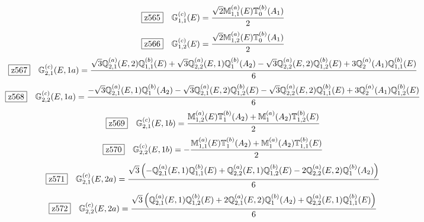 \documentclass[fleqn,10pt,landscape]{jsarticle}
\begin{document}
\begin{dmath*}
\hspace*{3mm}\fbox{z565}\quad \mathbb{G}_{1,1}^{(c)}(E)=\frac{\sqrt{2} \mathbb{M}_{1,1}^{(a)}(E) \mathbb{T}_{0}^{(b)}(A_{1})}{2}
\end{dmath*}
\begin{dmath*}
\hspace*{3mm}\fbox{z566}\quad \mathbb{G}_{1,2}^{(c)}(E)=\frac{\sqrt{2} \mathbb{M}_{1,2}^{(a)}(E) \mathbb{T}_{0}^{(b)}(A_{1})}{2}
\end{dmath*}
\begin{dmath*}
\hspace*{3mm}\fbox{z567}\quad \mathbb{G}_{2,1}^{(c)}(E,1a)=\frac{\sqrt{3} \mathbb{Q}_{2,1}^{(a)}(E,2) \mathbb{Q}_{1,1}^{(b)}(E) + \sqrt{3} \mathbb{Q}_{2,2}^{(a)}(E,1) \mathbb{Q}_{1}^{(b)}(A_{2}) - \sqrt{3} \mathbb{Q}_{2,2}^{(a)}(E,2) \mathbb{Q}_{1,2}^{(b)}(E) + 3 \mathbb{Q}_{2}^{(a)}(A_{1}) \mathbb{Q}_{1,1}^{(b)}(E)}{6}
\end{dmath*}
\begin{dmath*}
\hspace*{3mm}\fbox{z568}\quad \mathbb{G}_{2,2}^{(c)}(E,1a)=\frac{- \sqrt{3} \mathbb{Q}_{2,1}^{(a)}(E,1) \mathbb{Q}_{1}^{(b)}(A_{2}) - \sqrt{3} \mathbb{Q}_{2,1}^{(a)}(E,2) \mathbb{Q}_{1,2}^{(b)}(E) - \sqrt{3} \mathbb{Q}_{2,2}^{(a)}(E,2) \mathbb{Q}_{1,1}^{(b)}(E) + 3 \mathbb{Q}_{2}^{(a)}(A_{1}) \mathbb{Q}_{1,2}^{(b)}(E)}{6}
\end{dmath*}
\begin{dmath*}
\hspace*{3mm}\fbox{z569}\quad \mathbb{G}_{2,1}^{(c)}(E,1b)=\frac{\mathbb{M}_{1,2}^{(a)}(E) \mathbb{T}_{1}^{(b)}(A_{2}) + \mathbb{M}_{1}^{(a)}(A_{2}) \mathbb{T}_{1,2}^{(b)}(E)}{2}
\end{dmath*}
\begin{dmath*}
\hspace*{3mm}\fbox{z570}\quad \mathbb{G}_{2,2}^{(c)}(E,1b)=- \frac{\mathbb{M}_{1,1}^{(a)}(E) \mathbb{T}_{1}^{(b)}(A_{2}) + \mathbb{M}_{1}^{(a)}(A_{2}) \mathbb{T}_{1,1}^{(b)}(E)}{2}
\end{dmath*}
\begin{dmath*}
\hspace*{3mm}\fbox{z571}\quad \mathbb{G}_{2,1}^{(c)}(E,2a)=\frac{\sqrt{3} \left(- \mathbb{Q}_{2,1}^{(a)}(E,1) \mathbb{Q}_{1,1}^{(b)}(E) + \mathbb{Q}_{2,2}^{(a)}(E,1) \mathbb{Q}_{1,2}^{(b)}(E) - 2 \mathbb{Q}_{2,2}^{(a)}(E,2) \mathbb{Q}_{1}^{(b)}(A_{2})\right)}{6}
\end{dmath*}
\begin{dmath*}
\hspace*{3mm}\fbox{z572}\quad \mathbb{G}_{2,2}^{(c)}(E,2a)=\frac{\sqrt{3} \left(\mathbb{Q}_{2,1}^{(a)}(E,1) \mathbb{Q}_{1,2}^{(b)}(E) + 2 \mathbb{Q}_{2,1}^{(a)}(E,2) \mathbb{Q}_{1}^{(b)}(A_{2}) + \mathbb{Q}_{2,2}^{(a)}(E,1) \mathbb{Q}_{1,1}^{(b)}(E)\right)}{6}
\end{dmath*}
\end{document}

